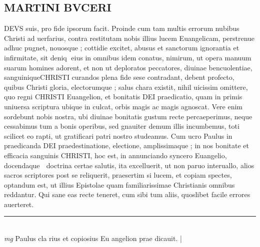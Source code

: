 \documentclass{article}
\begin{document}
\begin{pages}
\section*{MARTINI BVCERI }\pstart DEVS suis, pro fide ipsorum facit.   \pend\pstart Proinde cum tam multis errorum nubibus Christi ad uerfarius, contra restitutam nobis illius lucem Euangelicam, perstrenue adhuc pugnet, nouosque ; cottidie excitet, abusus et sanctorum ignorantia et infirmitate, sit deniq eius in omnibus idem conatus, nimirum, ut opera manuum suarum homines adorent, et non ut deploratos peccatores, diuinae bencuolentiae, sanguiniqueCHRISTI curandos plena fide sese contradant, debent profecto, quibus Christi gloria, electorumque ; salus chara existit, nihil uicissim omittere, quo regni CHRISTI Euangelion, et bonitatis DEI praedicatio, quam in primis uniuersa scriptura ubique in culcat, orbis magis ac magis agnoscat.  Vere enim sordebunt nobis nostra, ubi diuinae bonitatis gustum recte percaeperimus, neque  cessabimus tum a bonis operibus, sed gnauiter demum illis incumbemus, toti scilicet eo rapti, ut gratificari patri nostro studeamus.   \pend\pstart Cum ucro Paulus in praedicanda DEI praedestinatione, electione, amplissimaque ; in nos bonitate et efficacia sanguinis CHRISTI, hoc est, in annunciando syncero Euangelio, docendaque  doctrina certae salutis, ita excelluerit, ut non paruo interuallo, alios sacros scriptores post se reliquerit, praesertim si lucem, et copiam spectes, optandum est, ut illius Epistolae quam familiarissimae Christianis omnibus reddantur.  Qui sane eas recte teneret, cum sibi tum aliis, quoslibet facile errores auerteret.   \pend
\vspace{0.5cm}\noindent
\vspace{0.2cm}\rule{1cm}{0.2pt}\\ 
\hspace{0.2cm}\textit{mg}
\footnotesize Paulus cla rius et copiosius Eu angelion prae dicauit.  
\normalsize| 

\end{pages}
\end{document}
